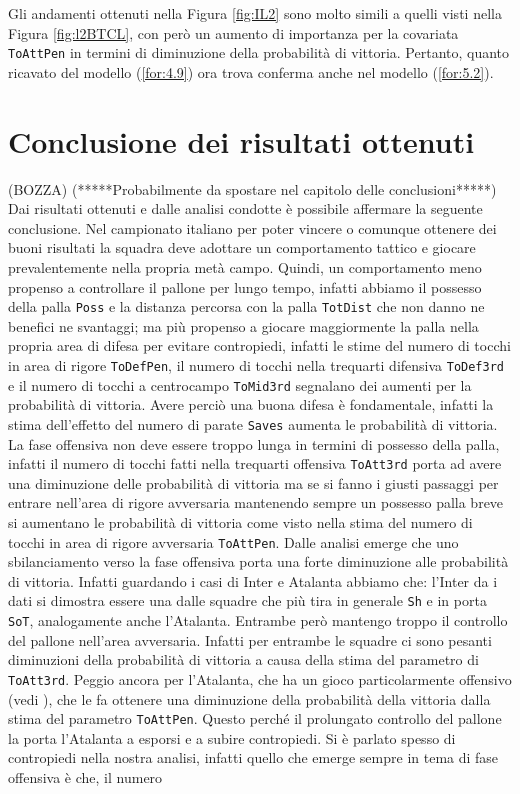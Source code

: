 Gli andamenti ottenuti nella Figura \ref{fig:IL2} sono molto simili a quelli visti nella Figura \ref{fig:l2BTCL}, con però un aumento di importanza per la covariata \texttt{ToAttPen} in termini di diminuzione della probabilità di vittoria. Pertanto, quanto ricavato del modello (\ref{for:4.9}) ora trova conferma anche nel modello (\ref{for:5.2}).\\

\section{Conclusione dei risultati ottenuti}(BOZZA)
(*****Probabilmente da spostare nel capitolo delle conclusioni*****)\\

Dai risultati ottenuti e dalle analisi condotte è possibile affermare la seguente conclusione. Nel campionato italiano per poter vincere o comunque ottenere dei buoni risultati la squadra deve adottare un comportamento tattico e giocare prevalentemente nella propria metà campo. Quindi, un comportamento meno propenso a controllare il pallone per lungo tempo, infatti abbiamo il possesso della palla \texttt{Poss} e la distanza percorsa con la palla \texttt{TotDist} che non danno ne benefici ne svantaggi; ma più propenso a giocare maggiormente la palla nella propria area di difesa per evitare contropiedi, infatti le stime del numero di tocchi in area di rigore \texttt{ToDefPen}, il numero di tocchi nella trequarti difensiva \texttt{ToDef3rd} e il numero di tocchi a centrocampo \texttt{ToMid3rd} segnalano dei aumenti per la probabilità di vittoria. Avere perciò una buona difesa è fondamentale, infatti la stima dell'effetto del numero di parate \texttt{Saves} aumenta le probabilità di vittoria. La fase offensiva non deve essere troppo lunga in termini di possesso della palla, infatti il numero di tocchi fatti nella trequarti offensiva \texttt{ToAtt3rd} porta ad avere una diminuzione delle probabilità di vittoria ma se si fanno i giusti passaggi per entrare nell'area di rigore avversaria mantenendo sempre un possesso palla breve si aumentano le probabilità di vittoria come visto nella stima del numero di tocchi in area di rigore avversaria \texttt{ToAttPen}. Dalle analisi emerge che uno sbilanciamento verso la fase offensiva porta una forte diminuzione alle probabilità di vittoria. Infatti guardando i casi di Inter e Atalanta abbiamo che: l'Inter da i dati si dimostra essere una dalle squadre che più tira in generale \texttt{Sh} e in porta \texttt{SoT}, analogamente anche l'Atalanta. Entrambe però mantengo troppo il controllo del pallone nell'area avversaria. Infatti per entrambe le squadre ci sono pesanti diminuzioni della probabilità di vittoria a causa della stima del parametro di \texttt{ToAtt3rd}. Peggio ancora per l'Atalanta, che ha un gioco particolarmente offensivo (vedi \textit{\cite{site:ataGioco}}), che le fa ottenere una diminuzione della probabilità della vittoria dalla stima del parametro \texttt{ToAttPen}. Questo perché il prolungato controllo del pallone la porta l'Atalanta a esporsi e a subire contropiedi. Si è parlato spesso di contropiedi nella nostra analisi, infatti quello che emerge sempre in tema di fase offensiva è che, il numero 